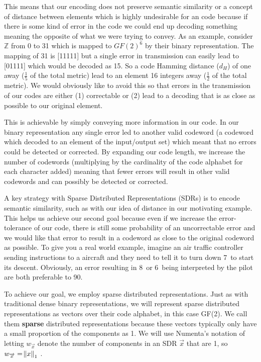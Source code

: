 \documentclass[oneside,12pt,openany]{book}
\begin{document}
	This means that our encoding does not preserve semantic similarity or a concept of distance between elements which is highly undesirable for an code because if there is some kind of error in the code we could end up decoding something meaning the opposite of what we were trying to convey. As an example, consider $\mathbb{Z}$ from 0 to 31 which is mapped to $GF(2)^{6}$ by their binary representation. The mapping of 31 is [11111] but a single error in transmission can easily lead to [01111] which would be decoded as 15. So a code Hamming distance ($d_{H}$) of one away ($\frac{1}{5}$ of the total metric) lead to an element 16 integers away ($\frac{1}{2}$ of the total metric). We would obviously like to avoid this so that errors in the transmission of our codes are either (1) correctable or (2) lead to a decoding that is as close as possible to our original element.
	
	This is achievable by simply conveying more information in our code. In our binary representation any single error led to another valid codeword (a codeword which decoded to an element of the input/output set) which meant that no errors could be detected or corrected. By expanding our code length, we increase the number of codewords (multiplying by the cardinality of the code alphabet for each character added) meaning that fewer errors will result in other valid codewords and can possibly be detected or corrected. 
	
	A key strategy with Sparse Distributed Representations (SDRs) is to encode semantic similarity, such as with our idea of distance in our motivating example. This helps us achieve our second goal because even if we increase the error-tolerance of our code, there is still some probability of an uncorrectable error and we would like that error to result in a codeword as close to the original codeword as possible. To give you a real world example, imagine an air traffic controller sending instructions to a aircraft and they need to tell it to turn down 7\textdegree~to start its descent. Obviously, an error resulting in 8\textdegree~or 6\textdegree~being interpreted by the pilot are both preferable to 90\textdegree.
	
	To achieve our goal, we employ sparse distributed representations. Just as with traditional dense binary representations, we will represent sparse distributed representations as vectors over their code alphabet, in this case GF(2). We call them \textbf{sparse} distributed representations because these vectors typically only have a small proportion of the components as 1. We will use Numenta's notation of letting $w_{\overrightarrow{x}}$ denote the number of components in an SDR $\overrightarrow{x}$ that are 1, so $w_{\overrightarrow{x}} = \norm{x}_{1}$ \cite{Properties}.
	
\end{document}
